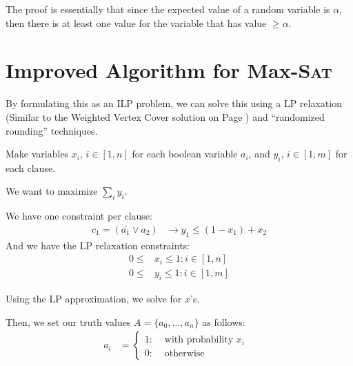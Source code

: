                 The proof is essentially that since the expected value of a random variable  is $\alpha$, then there is at least one value for the variable that has value $\ge \alpha$.
            \section{Improved Algorithm for Max-\textsc{Sat}} %
            \label{sec:improved_approximation_algorithm_for_the_max_sat}
                By formulating this as an ILP problem, we can solve this using a LP relaxation (Similar to the Weighted Vertex Cover solution on Page \pageref{ssub:weighted_vertex_cover}) and ``randomized rounding'' techniques.

                Make variables $x_i$, $i \in [1, n]$ for each boolean variable $a_i$, and $y_i$, $i \in [1, m]$ for each clause.

                We want to maximize $\sum_i y_i$.

                We have one constraint per clause:
                \begin{align*}
                    c_1 = (\bar{a_1} \lor a_2) &\to y_1 \le (1 - x_1) + x_2
                \end{align*}
                And we have the LP relaxation constraints:
                \begin{align*}
                    0 \le &x_i \le 1 : i \in [1, n] \\
                    0 \le &y_i \le 1 : i \in [1, m]
                \end{align*}

                Using the \p LP approximation, we solve for $x$'s.

                Then, we set our truth values $A = \{ a_0, \ldots, a_n\}$ as follows:
                \begin{align*}
                    a_i &=
                        \left\{
                            \begin{array}{lr}
                                1 :& \text{ with probability $x_i$ }\\
                                0 :& \text{ otherwise }
                            \end{array}
                        \right.
                \end{align*}

